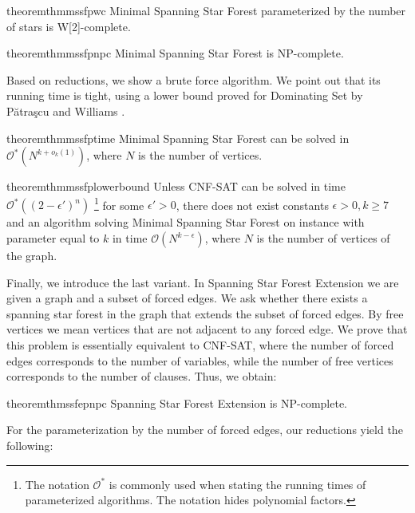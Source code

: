 \documentclass[en]{pracamgr}
\theoremstyle{definition}
\newcommand{\mssfp}{{\sc Minimal Spanning Star Forest}}
\newcommand{\ssfep}{{\sc Spanning Star Forest Extension}}
\newcommand{\domsetp}{{\sc Dominating Set}}
\newcommand{\cnfsat}{{\sc CNF-SAT}}
\begin{document}
\begin{restatable}{theorem}{thmmssfpwc}\label{thm-mssfp-w2c}
	\mssfp{} parameterized by the number of stars is \textup{W[2]}-complete.
\end{restatable}

\begin{restatable}{theorem}{thmmssfpnpc}\label{thm-mssfp-npc}
	\mssfp{} is \textup{NP-complete}.
\end{restatable}

\noindent
Based on reductions, we show a brute force algorithm. We point out that its running time is tight, using a lower bound proved for \domsetp{} by Pătraşcu and Williams \cite{DomSet}. 

\begin{restatable}{theorem}{thmmssfptime}\label{thm-mssfp-time}
	\mssfp{} can be solved in $\mathcal{O}^*(N^{k + o_k(1)})$, where $N$ is the number of vertices.
\end{restatable}

\begin{restatable}{theorem}{thmmssfplowerbound}\label{thm-mssfp-lowerbound}
	Unless \cnfsat{} can be solved in time $\mathcal{O}^*((2-\epsilon')^n)$
	\footnote{The notation $\mathcal{O}^*$ is commonly used when stating the running times of parameterized algorithms. The notation hides polynomial factors.}
	 for some $\epsilon' > 0$, there does not exist constants $\epsilon > 0,k\geq 7$ and an algorithm solving \mssfp{} on instance with parameter equal to $k$ in time $\mathcal{O}(N^{k-\epsilon})$, where $N$ is the number of vertices of the graph.
\end{restatable}

Finally, we introduce the last variant. In \ssfep{} we are given a graph and a subset of forced edges. We ask whether there exists a spanning star forest in the graph that extends the subset of forced edges. By free vertices we mean vertices that are not adjacent to any forced edge. We prove that this problem is essentially equivalent to \cnfsat{}, where the number of forced edges corresponds to the number of variables, while the number of free vertices corresponds to the number of clauses. Thus, we obtain:

\begin{restatable}{theorem}{thmssfepnpc}\label{thm-ssfep-npc}
	\ssfep{} is \textup{NP}-complete.
\end{restatable}

\noindent
For the parameterization by the number of forced edges, our reductions yield the following:
\end{document}
